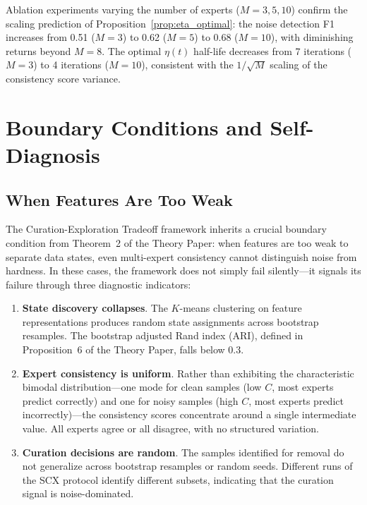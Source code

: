 \documentclass{article}
\begin{document}
Ablation experiments varying the number of experts ($M = 3, 5, 10$) confirm the scaling prediction of Proposition~\ref{prop:eta_optimal}: the noise detection F1 increases from 0.51 ($M = 3$) to 0.62 ($M = 5$) to 0.68 ($M = 10$), with diminishing returns beyond $M = 8$. The optimal $\eta(t)$ half-life decreases from 7 iterations ($M = 3$) to 4 iterations ($M = 10$), consistent with the $1/\sqrt{M}$ scaling of the consistency score variance.

\section{Boundary Conditions and Self-Diagnosis}
\label{sec:boundary}

\subsection{When Features Are Too Weak}
\label{sec:weak_features}

The Curation-Exploration Tradeoff framework inherits a crucial boundary condition from Theorem~2 of the Theory Paper: when features are too weak to separate data states, even multi-expert consistency cannot distinguish noise from hardness. In these cases, the framework does not simply fail silently---it signals its failure through three diagnostic indicators:

\begin{enumerate}
    \item \textbf{State discovery collapses}. The $K$-means clustering on feature representations produces random state assignments across bootstrap resamples. The bootstrap adjusted Rand index (ARI), defined in Proposition~6 of the Theory Paper, falls below 0.3.
    \item \textbf{Expert consistency is uniform}. Rather than exhibiting the characteristic bimodal distribution---one mode for clean samples (low $C$, most experts predict correctly) and one for noisy samples (high $C$, most experts predict incorrectly)---the consistency scores concentrate around a single intermediate value. All experts agree or all disagree, with no structured variation.
    \item \textbf{Curation decisions are random}. The samples identified for removal do not generalize across bootstrap resamples or random seeds. Different runs of the SCX protocol identify different subsets, indicating that the curation signal is noise-dominated.
\end{enumerate}
\end{document}
